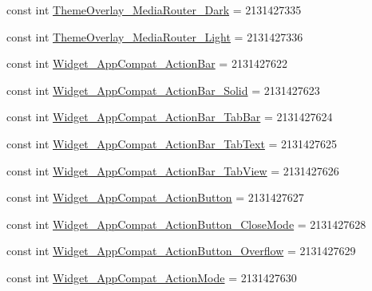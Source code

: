 \begin{DoxyCompactItemize}
\item 
const int \mbox{\hyperlink{class_f_w_p_s___app_1_1_droid_1_1_resource_1_1_style_a380ea8e2d64a65d9590d1cae85614eeb}{Theme\+Overlay\+\_\+\+Media\+Router\+\_\+\+Dark}} = 2131427335
\item 
const int \mbox{\hyperlink{class_f_w_p_s___app_1_1_droid_1_1_resource_1_1_style_a20346b775335542970e90cd6bd60a70b}{Theme\+Overlay\+\_\+\+Media\+Router\+\_\+\+Light}} = 2131427336
\item 
const int \mbox{\hyperlink{class_f_w_p_s___app_1_1_droid_1_1_resource_1_1_style_a6b491d8511e67022da81831a58ea82c7}{Widget\+\_\+\+App\+Compat\+\_\+\+Action\+Bar}} = 2131427622
\item 
const int \mbox{\hyperlink{class_f_w_p_s___app_1_1_droid_1_1_resource_1_1_style_abd85bac36045578773551c3bbf5a0950}{Widget\+\_\+\+App\+Compat\+\_\+\+Action\+Bar\+\_\+\+Solid}} = 2131427623
\item 
const int \mbox{\hyperlink{class_f_w_p_s___app_1_1_droid_1_1_resource_1_1_style_a36d3d41b849d4a875a09eb963ab1ea5c}{Widget\+\_\+\+App\+Compat\+\_\+\+Action\+Bar\+\_\+\+Tab\+Bar}} = 2131427624
\item 
const int \mbox{\hyperlink{class_f_w_p_s___app_1_1_droid_1_1_resource_1_1_style_a5c482e991e5ea6207ceb9f6ad5ef7a0a}{Widget\+\_\+\+App\+Compat\+\_\+\+Action\+Bar\+\_\+\+Tab\+Text}} = 2131427625
\item 
const int \mbox{\hyperlink{class_f_w_p_s___app_1_1_droid_1_1_resource_1_1_style_a55832ea33dcad7fca2344e7f680c7bd7}{Widget\+\_\+\+App\+Compat\+\_\+\+Action\+Bar\+\_\+\+Tab\+View}} = 2131427626
\item 
const int \mbox{\hyperlink{class_f_w_p_s___app_1_1_droid_1_1_resource_1_1_style_af509e1becd4bc10fc59bdfb08ac17428}{Widget\+\_\+\+App\+Compat\+\_\+\+Action\+Button}} = 2131427627
\item 
const int \mbox{\hyperlink{class_f_w_p_s___app_1_1_droid_1_1_resource_1_1_style_aeb19f96276ae3761d4bbae89362db17b}{Widget\+\_\+\+App\+Compat\+\_\+\+Action\+Button\+\_\+\+Close\+Mode}} = 2131427628
\item 
const int \mbox{\hyperlink{class_f_w_p_s___app_1_1_droid_1_1_resource_1_1_style_a54bc31e5f32d1d38e7bc52d01e90ed66}{Widget\+\_\+\+App\+Compat\+\_\+\+Action\+Button\+\_\+\+Overflow}} = 2131427629
\item 
const int \mbox{\hyperlink{class_f_w_p_s___app_1_1_droid_1_1_resource_1_1_style_ad628486d7ab67774499e6271d7698ff0}{Widget\+\_\+\+App\+Compat\+\_\+\+Action\+Mode}} = 2131427630
\item 

\end{DoxyCompactItemize}
